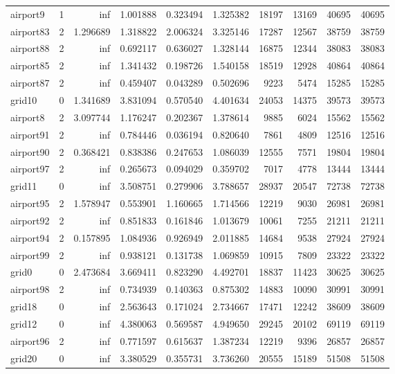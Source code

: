 \begin{longtable}{|l|r|r|r|r|r|r|r|r|r|}
airport9 & 1 & inf & 1.001888 & 0.323494 & 1.325382 & 18197 & 13169 & 40695 & 40695 \\
airport83 & 2 & 1.296689 & 1.318822 & 2.006324 & 3.325146 & 17287 & 12567 & 38759 & 38759 \\
airport88 & 2 & inf & 0.692117 & 0.636027 & 1.328144 & 16875 & 12344 & 38083 & 38083 \\
airport85 & 2 & inf & 1.341432 & 0.198726 & 1.540158 & 18519 & 12928 & 40864 & 40864 \\
airport87 & 2 & inf & 0.459407 & 0.043289 & 0.502696 & 9223 & 5474 & 15285 & 15285 \\
grid10 & 0 & 1.341689 & 3.831094 & 0.570540 & 4.401634 & 24053 & 14375 & 39573 & 39573 \\
airport8 & 2 & 3.097744 & 1.176247 & 0.202367 & 1.378614 & 9885 & 6024 & 15562 & 15562 \\
airport91 & 2 & inf & 0.784446 & 0.036194 & 0.820640 & 7861 & 4809 & 12516 & 12516 \\
airport90 & 2 & 0.368421 & 0.838386 & 0.247653 & 1.086039 & 12555 & 7571 & 19804 & 19804 \\
airport97 & 2 & inf & 0.265673 & 0.094029 & 0.359702 & 7017 & 4778 & 13444 & 13444 \\
grid11 & 0 & inf & 3.508751 & 0.279906 & 3.788657 & 28937 & 20547 & 72738 & 72738 \\
airport95 & 2 & 1.578947 & 0.553901 & 1.160665 & 1.714566 & 12219 & 9030 & 26981 & 26981 \\
airport92 & 2 & inf & 0.851833 & 0.161846 & 1.013679 & 10061 & 7255 & 21211 & 21211 \\
airport94 & 2 & 0.157895 & 1.084936 & 0.926949 & 2.011885 & 14684 & 9538 & 27924 & 27924 \\
airport99 & 2 & inf & 0.938121 & 0.131738 & 1.069859 & 10915 & 7809 & 23322 & 23322 \\
grid0 & 0 & 2.473684 & 3.669411 & 0.823290 & 4.492701 & 18837 & 11423 & 30625 & 30625 \\
airport98 & 2 & inf & 0.734939 & 0.140363 & 0.875302 & 14883 & 10090 & 30991 & 30991 \\
grid18 & 0 & inf & 2.563643 & 0.171024 & 2.734667 & 17471 & 12242 & 38609 & 38609 \\
grid12 & 0 & inf & 4.380063 & 0.569587 & 4.949650 & 29245 & 20102 & 69119 & 69119 \\
airport96 & 2 & inf & 0.771597 & 0.615637 & 1.387234 & 12219 & 9396 & 26857 & 26857 \\
grid20 & 0 & inf & 3.380529 & 0.355731 & 3.736260 & 20555 & 15189 & 51508 & 51508 \\

\end{longtable}
